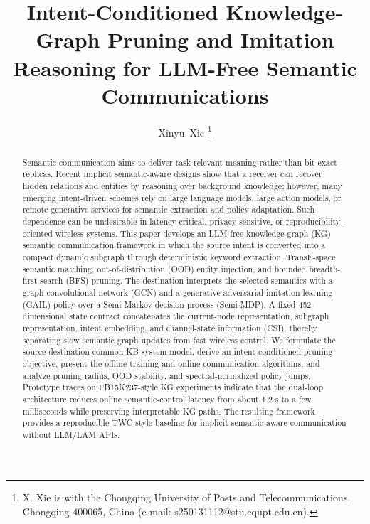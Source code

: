 \documentclass[journal]{IEEEtran}
\begin{document}
\title{Intent-Conditioned Knowledge-Graph Pruning and Imitation Reasoning for LLM-Free Semantic Communications}

\author{Xinyu~Xie%
\thanks{X. Xie is with the Chongqing University of Posts and Telecommunications, Chongqing 400065, China (e-mail: s250131112@stu.cqupt.edu.cn).}}

\markboth{}{}

\maketitle

\begin{abstract}
Semantic communication aims to deliver task-relevant meaning rather than bit-exact replicas. Recent implicit semantic-aware designs show that a receiver can recover hidden relations and entities by reasoning over background knowledge; however, many emerging intent-driven schemes rely on large language models, large action models, or remote generative services for semantic extraction and policy adaptation. Such dependence can be undesirable in latency-critical, privacy-sensitive, or reproducibility-oriented wireless systems. This paper develops an LLM-free knowledge-graph (KG) semantic communication framework in which the source intent is converted into a compact dynamic subgraph through deterministic keyword extraction, TransE-space semantic matching, out-of-distribution (OOD) entity injection, and bounded breadth-first-search (BFS) pruning. The destination interprets the selected semantics with a graph convolutional network (GCN) and a generative-adversarial imitation learning (GAIL) policy over a Semi-Markov decision process (Semi-MDP). A fixed 452-dimensional state contract concatenates the current-node representation, subgraph representation, intent embedding, and channel-state information (CSI), thereby separating slow semantic graph updates from fast wireless control. We formulate the source-destination-common-KB system model, derive an intent-conditioned pruning objective, present the offline training and online communication algorithms, and analyze pruning radius, OOD stability, and spectral-normalized policy jumps. Prototype traces on FB15K237-style KG experiments indicate that the dual-loop architecture reduces online semantic-control latency from about 1.2 s to a few milliseconds while preserving interpretable KG paths. The resulting framework provides a reproducible TWC-style baseline for implicit semantic-aware communication without LLM/LAM APIs.
\end{abstract}
\end{document}

